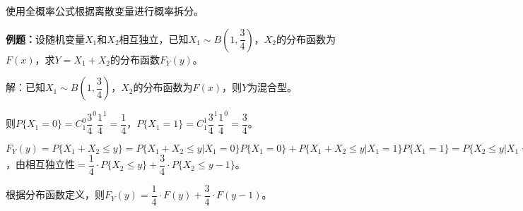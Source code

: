 \documentclass[UTF8, 12pt]{ctexart}
\begin{document}
使用全概率公式根据离散变量进行概率拆分。

\textbf{例题：}设随机变量$X_1$和$X_2$相互独立，已知$X_1\sim B\left(1,\dfrac{3}{4}\right)$，$X_2$的分布函数为$F(x)$，求$Y=X_1+X_2$的分布函数$F_Y(y)$。

解：已知$X_1\sim B\left(1,\dfrac{3}{4}\right)$，$X_2$的分布函数为$F(x)$，则$Y$为混合型。

则$P\{X_1=0\}=C_1^0\dfrac{3}{4}^0\dfrac{1}{4}^1=\dfrac{1}{4}$，$P\{X_1=1\}=C_1^1\dfrac{3}{4}^1\dfrac{1}{4}^0=\dfrac{3}{4}$。

$F_Y(y)=P\{X_1+X_2\leqslant y\}=P\{X_1+X_2\leqslant y|X_1=0\}P\{X_1=0\}+P\{X_1+X_2\leqslant y|X_1=1\}P\{X_1=1\}=P\{X_2\leqslant y|X_1=0\}P\{X_1=0\}+P\{1+X_2\leqslant y|X_1=1\}P\{X_1=1\}$，由相互独立性$=\dfrac{1}{4}\cdot P\{X_2\leqslant y\}+\dfrac{3}{4}\cdot P\{X_2\leqslant y-1\}$。

根据分布函数定义，则$F_Y(y)=\dfrac{1}{4}\cdot F(y)+\dfrac{3}{4}\cdot F(y-1)$。
\end{document}
